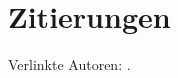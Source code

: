 \documentclass[ngerman]{scrbook}
\begin{document}
\chapter{Zitierungen}
Verlinkte Autoren: \citeauthor{ABC01} \cite{ABC01}.
\nocite{*}
\printbibliography
\end{document}
